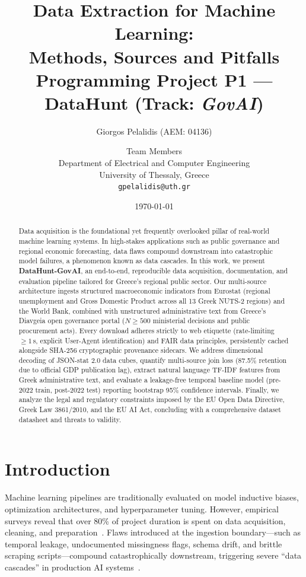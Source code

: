\documentclass[11pt,a4paper]{article}
\title{\textbf{Data Extraction for Machine Learning:\\ Methods, Sources and Pitfalls}\\[6pt]
       \large Programming Project P1 --- DataHunt (Track: \textit{GovAI})}
\author{Giorgos Pelalidis (AEM: 04136) \and Team Members\\
        \small Department of Electrical and Computer Engineering\\
        \small University of Thessaly, Greece\\
        \small \texttt{gpelalidis@uth.gr}}
\date{\today}
\begin{document}
\maketitle

\begin{abstract}
Data acquisition is the foundational yet frequently overlooked pillar of real-world machine learning systems. In high-stakes applications such as public governance and regional economic forecasting, data flaws compound downstream into catastrophic model failures, a phenomenon known as data cascades. In this work, we present \textbf{DataHunt-GovAI}, an end-to-end, reproducible data acquisition, documentation, and evaluation pipeline tailored for Greece's regional public sector. Our multi-source architecture ingests structured macroeconomic indicators from Eurostat (regional unemployment and Gross Domestic Product across all 13 Greek NUTS-2 regions) and the World Bank, combined with unstructured administrative text from Greece's Diavgeia open governance portal ($N \ge 500$ ministerial decisions and public procurement acts). Every download adheres strictly to web etiquette (rate-limiting $\ge 1$\,s, explicit User-Agent identification) and FAIR data principles, persistently cached alongside SHA-256 cryptographic provenance sidecars. We address dimensional decoding of JSON-stat 2.0 data cubes, quantify multi-source join loss (87.5\% retention due to official GDP publication lag), extract natural language TF-IDF features from Greek administrative text, and evaluate a leakage-free temporal baseline model (pre-2022 train, post-2022 test) reporting bootstrap 95\% confidence intervals. Finally, we analyze the legal and regulatory constraints imposed by the EU Open Data Directive, Greek Law 3861/2010, and the EU AI Act, concluding with a comprehensive dataset datasheet and threats to validity.
\end{abstract}

\section{Introduction}
Machine learning pipelines are traditionally evaluated on model inductive biases, optimization architectures, and hyperparameter tuning. However, empirical surveys reveal that over 80\% of project duration is spent on data acquisition, cleaning, and preparation~\citep{roh2021survey}. Flaws introduced at the ingestion boundary---such as temporal leakage, undocumented missingness flags, schema drift, and brittle scraping scripts---compound catastrophically downstream, triggering severe ``data cascades'' in production AI systems~\citep{sambasivan2021cascades}.
\end{document}
